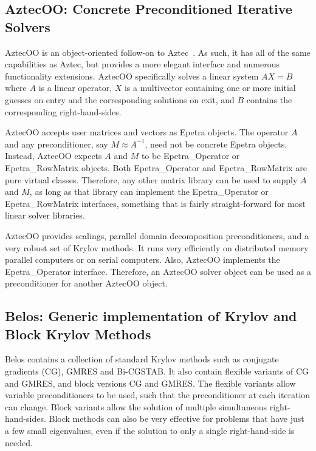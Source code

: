 \documentclass[12pt,relax]{TrilinosOverview}
\begin{document}
\subsection{AztecOO: Concrete Preconditioned Iterative Solvers}

AztecOO is an object-oriented follow-on to Aztec~\cite{Aztec2.1}.  
As such, it has all of the same capabilities as Aztec, but provides 
a more elegant interface and numerous functionality extensions.  
AztecOO specifically solves a linear system $AX=B$ where $A$ is a 
linear operator, $X$ is a multivector containing one or more initial 
guesses on entry and the corresponding solutions on exit, and $B$ 
contains the corresponding right-hand-sides.

AztecOO accepts user matrices and vectors as Epetra objects.  The 
operator $A$ and any preconditioner, say $M \approx A^{-1}$, need 
not be concrete Epetra objects.  Instead, AztecOO expects $A$ and 
$M$ to be Epetra\_Operator or Epetra\_RowMatrix objects.  Both 
Epetra\_Operator and Epetra\_RowMatrix are pure virtual classes.  
Therefore, any other matrix library can be used to supply $A$ 
and $M$, as long as that library can implement the  Epetra\_Operator 
or Epetra\_RowMatrix interfaces, something that is fairly 
straight-forward for most linear solver libraries.

AztecOO provides scalings, parallel domain decomposition 
preconditioners, and a very robust set of Krylov methods.  It runs 
very efficiently on distributed memory parallel computers or on 
serial computers.  Also, AztecOO implements the Epetra\_Operator 
interface.  Therefore, an AztecOO solver object can be used as a 
preconditioner for another AztecOO object.

\subsection{Belos: Generic implementation of Krylov and Block Krylov
Methods}

Belos contains a collection of standard Krylov methods such as
conjugate gradients (CG), GMRES and Bi-CGSTAB.  It also contain flexible
variants of CG and GMRES, and block versions CG and GMRES.  The
flexible variants allow variable preconditioners to be used, such that
the preconditioner at each iteration can change.  Block variants allow
the solution of multiple simultaneous right-hand-sides.  Block methods
can also be very effective for problems that have just a few small
eigenvalues, even if the solution to only a single right-hand-side is
needed.
\end{document}
